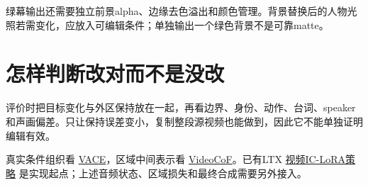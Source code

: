 绿幕输出还需要独立前景alpha、边缘去色溢出和颜色管理。背景替换后的人物光照若需变化，应放入可编辑条件；单独输出一个绿色背景不是可靠matte。

\section{怎样判断改对而不是没改}\label{seedance-m23-ux600eux6837ux5224ux65adux6539ux5bf9ux800cux4e0dux662fux6ca1ux6539}

评价时把目标变化与外区保持放在一起，再看边界、身份、动作、台词、speaker 和声画偏差。只让保持误差变小，复制整段源视频也能做到，因此它不能单独证明编辑有效。

真实条件组织看 \href{https://github.com/ali-vilab/VACE}{VACE}，区域中间表示看 \href{https://github.com/knightyxp/VideoCoF}{VideoCoF}。已有LTX \href{https://github.com/Lightricks/LTX-2/blob/bd92a5f408eb8c99f8c05e9fe2fcaaec8b56b638/packages/ltx-trainer/src/ltx_trainer/training_strategies/video_to_video.py}{视频IC-LoRA策略} 是实现起点；上述音频状态、区域损失和最终合成需要另外接入。
